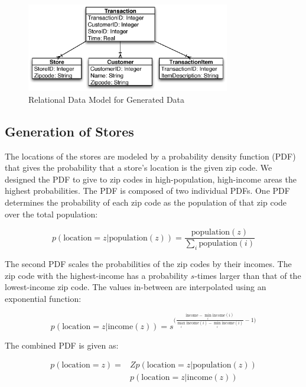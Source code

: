 \documentclass[conference]{IEEEtran}
\begin{document}
\begin{figure}[!t]
  \centering
  \includegraphics[width=3.5in]{figures/transactions_data_model.eps}
  \caption{Relational Data Model for Generated Data}
  \label{fig:relational-data-model}
\end{figure}

\subsection{Generation of Stores}
The locations of the stores are modeled by a probability density function (PDF) that gives the probability that a store's location is the given zip code. We designed the PDF to give to zip codes in high-population, high-income areas the highest probabilities. The PDF is composed of two individual PDFs. One PDF determines the probability of each zip code as the population of that zip code over the total population:

\begin{equation*}
p(\text{location}=z | \text{population}(z)) = \frac{\text{population}(z)}{\sum_{i} \text{population}(i)}
\end{equation*}

The second PDF scales the probabilities of the zip codes by their incomes.  The zip code with the highest-income has a probability $s$-times larger than that of the lowest-income zip code. The values in-between are interpolated using an exponential function:

\begin{equation*}
p(\text{location}=z | \text{income}(z)) = s ^ {\big( \frac{\text{income} - \min_i{\textrm{income}(i)}} {\max_i{\textrm{income}(i)} - \min_i{\textrm{income}(i)}} - 1 \big)}
\end{equation*}

The combined PDF is given as: 

\begin{align*}
p(\text{location}=z) = &Z p(\text{location}=z | \text{population}(z)) \\
&p(\text{location}=z | \text{income}(z))
\end{align*}
\end{document}
